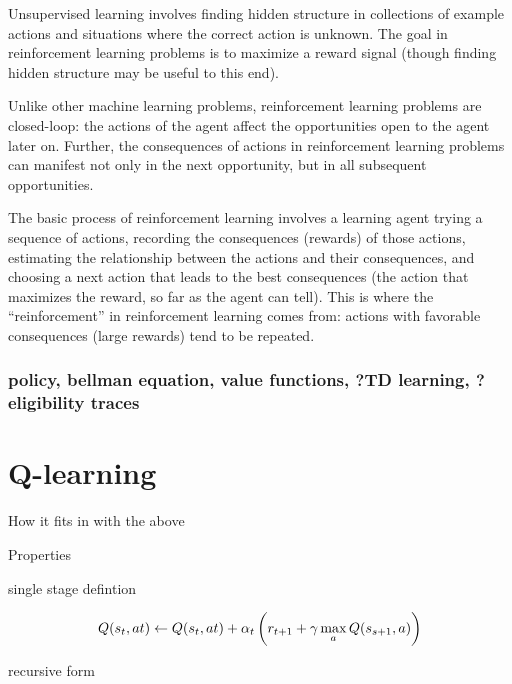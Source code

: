 \documentclass[12pt]{article}
\begin{document}
Unsupervised learning involves finding hidden structure in collections of example actions and situations where the correct action is unknown. The goal in reinforcement learning problems is to maximize a reward signal (though finding hidden structure may be useful to this end).

Unlike other machine learning problems, reinforcement learning problems are closed-loop: the actions of the agent affect the opportunities open to the agent later on. Further, the consequences of actions in reinforcement learning problems can manifest not only in the next opportunity, but in all subsequent opportunities.


The basic process of reinforcement learning involves a learning agent trying a sequence of actions, recording the consequences (rewards) of those actions, estimating the relationship between the actions and their consequences, and choosing a next action that leads to the best consequences (the action that maximizes the reward, so far as the agent can tell). This is where the ``reinforcement'' in reinforcement learning comes from: actions with favorable consequences (large rewards) tend to be repeated.


\subsubsection{policy, bellman equation, value functions, ?TD learning, ?eligibility traces} %
\label{ssub:policy_bellman_equation_value_functions_td_learning_eligibility_traces}



\section{Q-learning} %
\label{sec:q_learning}

How it fits in with the above

Properties

single stage defintion

\[
Q(s_{t}, a{t}) \leftarrow Q(s_{t}, a{t}) + \alpha_{t} \del{r_{t+1} + \gamma \max_{a} Q(s_{s + 1}, a)}
\]

recursive form
\end{document}
